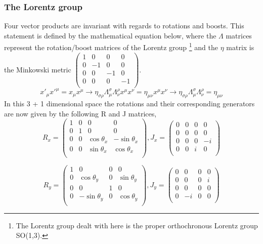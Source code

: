\subsubsection{The Lorentz group}
Four vector products are invariant with regards to rotations and boosts. This statement is defined by the mathematical equation below, where the $\Lambda$ matrices represent the rotation/boost matrices of the Lorentz group \footnote{The Lorentz group dealt with here is the proper orthochronous Lorentz group SO(1,3).} and the $\eta$ matrix is the Minkowski metric $\left( \begin{smallmatrix} 1 & 0 & 0 & 0 \\ 0 & -1 & 0 & 0 \\ 0 & 0 & -1 & 0 \\ 0 & 0 & 0 & -1 \\ \end{smallmatrix} \right)$.
\begin{equation}
\label{eq:lorentzinv}
x'_{\mu} x'^{\mu} = x_{\mu} x^{\mu} \rightarrow \eta_{\sigma\rho} \Lambda^{\sigma}_{\mu}  \Lambda^{\rho}_{\nu} x^{\mu} x^{\nu} = \eta_{\mu\nu} x^{\mu} x^{\nu}
\rightarrow \eta_{\sigma\rho} \Lambda^{\sigma}_{\mu}  \Lambda^{\rho}_{\nu} = \eta_{\mu\nu}
\end{equation}
In this 3 + 1 dimensional space the rotations and their corresponding generators are now given by the following R and J matrices, 
\begin{equation}
R_x = 
\begin{pmatrix}
1 & 0 & 0 & 0\\
0 & 1 & 0 & 0 \\
0 & 0 & \cos\theta_x & -\sin\theta_x \\
0 & 0 & \sin\theta_x & \cos\theta_x \\
\end{pmatrix},
J_x = 
\begin{pmatrix}
0 & 0 & 0 & 0\\
0 & 0 & 0 & 0 \\
0 & 0 & 0 & -i \\
0 & 0 & i & 0 \\
\end{pmatrix}
\end{equation}

\begin{equation}
R_y = 
\begin{pmatrix}
1 & 0 & 0 & 0\\
0 & \cos\theta_y & 0 & \sin\theta_y \\
0 & 0 & 1 & 0 \\
0 & -\sin\theta_y & 0 & \cos\theta_y \\
\end{pmatrix},
J_y = 
\begin{pmatrix}
0 & 0 & 0 & 0\\
0 & 0 & 0 & i \\
0 & 0 & 0 & 0 \\
0 & -i & 0 & 0 \\
\end{pmatrix}
\end{equation}

